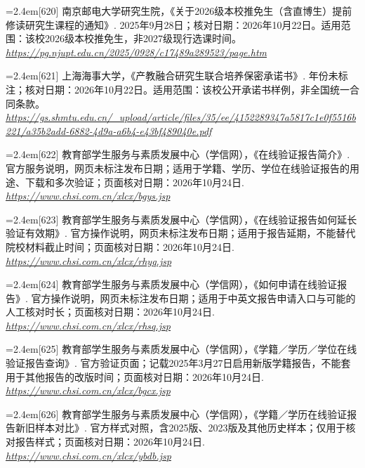 {\par\noindent\hangindent=2.4em\label{src:S0766}{\color{cAccent}[620]} 南京邮电大学研究生院，《关于2026级本校推免生（含直博生）提前修读研究生课程的通知》. 2025年9月28日；核对日期：2026年10月22日。适用范围：该校2026级本校推免生，非2027级现行选课时间。 \textit{\url{https://pg.njupt.edu.cn/2025/0928/c17489a289523/page.htm}}\par
\par\noindent\hangindent=2.4em\label{src:S0767}{\color{cAccent}[621]} 上海海事大学，《产教融合研究生联合培养保密承诺书》. 年份未标注；核对日期：2026年10月22日。适用范围：该校公开承诺书样例，非全国统一合同条款。 \textit{\url{https://gs.shmtu.edu.cn/_upload/article/files/35/ee/4152289347a5817c1e0f5516b221/a35b2add-6882-4d9a-a6b4-e43bf489040e.pdf}}\par
\par\noindent\hangindent=2.4em\label{src:S0768}{\color{cAccent}[622]} 教育部学生服务与素质发展中心（学信网），《在线验证报告简介》. 官方服务说明，网页未标注发布日期；适用于学籍、学历、学位在线验证报告的用途、下载和多次验证；页面核对日期：2026年10月24日. \textit{\url{https://www.chsi.com.cn/xlcx/bgys.jsp}}\par
\par\noindent\hangindent=2.4em\label{src:S0769}{\color{cAccent}[623]} 教育部学生服务与素质发展中心（学信网），《在线验证报告如何延长验证有效期》. 官方操作说明，网页未标注发布日期；适用于报告延期，不能替代院校材料截止时间；页面核对日期：2026年10月24日. \textit{\url{https://www.chsi.com.cn/xlcx/rhyq.jsp}}\par
\par\noindent\hangindent=2.4em\label{src:S0770}{\color{cAccent}[624]} 教育部学生服务与素质发展中心（学信网），《如何申请在线验证报告》. 官方操作说明，网页未标注发布日期；适用于中英文报告申请入口与可能的人工核对时长；页面核对日期：2026年10月24日. \textit{\url{https://www.chsi.com.cn/xlcx/rhsq.jsp}}\par
\par\noindent\hangindent=2.4em\label{src:S0771}{\color{cAccent}[625]} 教育部学生服务与素质发展中心（学信网），《学籍／学历／学位在线验证报告查询》. 官方验证页面；记载2025年3月27日启用新版学籍报告，不能套用于其他报告的改版时间；页面核对日期：2026年10月24日. \textit{\url{https://www.chsi.com.cn/xlcx/bgcx.jsp}}\par
\par\noindent\hangindent=2.4em\label{src:S0772}{\color{cAccent}[626]} 教育部学生服务与素质发展中心（学信网），《学籍／学历在线验证报告新旧样本对比》. 官方样式对照，含2025版、2023版及其他历史样本；仅用于核对报告样式；页面核对日期：2026年10月24日. \textit{\url{https://www.chsi.com.cn/xlcx/ybdb.jsp}}\par
}
